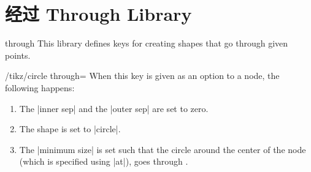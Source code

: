 %
%
%


\section{经过 Through Library}
\label{section-through-library}

\begin{tikzlibrary}{through}
    This library defines keys for creating shapes that go through given points.
\end{tikzlibrary}

\begin{key}{/tikz/circle through=}
    When this key is given as an option to a node, the following happens:
    \begin{enumerate}
        \item The |inner sep| and the |outer sep| are set to zero.
        \item The shape is set to |circle|.
        \item The |minimum size| is set such that the circle around the center
            of the node (which is specified using |at|), goes through
            .
    \end{enumerate}
\begin{codeexample}[preamble={\usetikzlibrary{through}}]
\end{codeexample}
\end{key}


